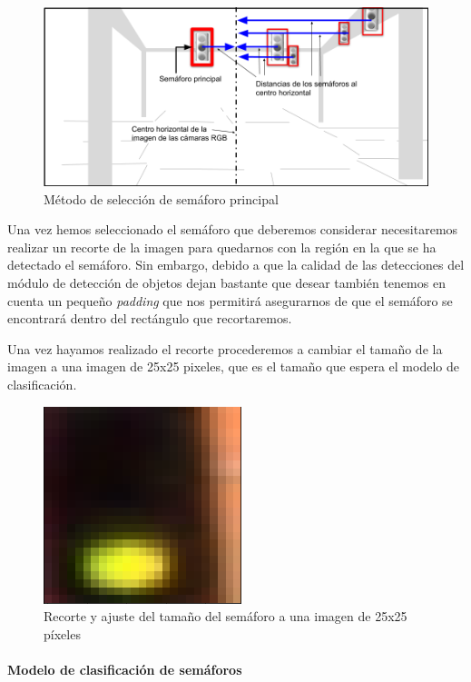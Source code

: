 \begin{figure}[h!]
    \centering
    \includegraphics[width=\linewidth]{img/semaforoPrincipal.png}
    \caption{Método de selección de semáforo principal}
    \label{fig:semaforoPrincipal}
\end{figure}

Una vez hemos seleccionado el semáforo que deberemos considerar necesitaremos realizar un recorte de la imagen para quedarnos con la región en la que se ha detectado el semáforo.
Sin embargo, debido a que la calidad de las detecciones del módulo de detección de objetos dejan bastante que desear también tenemos en cuenta un pequeño \textit{padding} que nos permitirá asegurarnos de que el semáforo se encontrará dentro del rectángulo que recortaremos.

Una vez hayamos realizado el recorte procederemos a cambiar el tamaño de la imagen a una imagen de 25x25 pixeles, que es el tamaño que espera el modelo de clasificación.
\begin{figure}[h!]
    \centering
    \includegraphics[width=.25\linewidth]{img/semaf25x25.png}
    \caption{Recorte y ajuste del tamaño del semáforo a una imagen de 25x25 píxeles}
    \label{fig:semaf25x25}
\end{figure}




\paragraph{Modelo de clasificación de semáforos}\mbox{}\\

